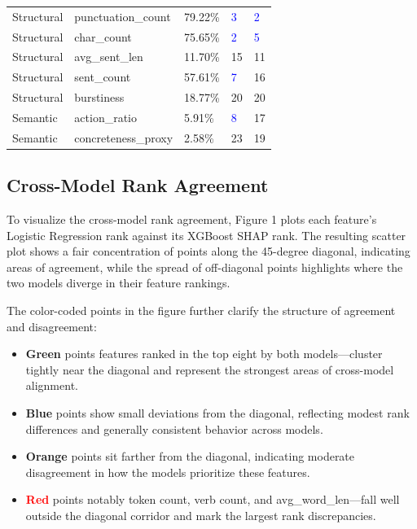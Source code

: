 \documentclass[12pt]{article}
\begin{document}
\begin{longtable}{lllll}
Structural & punctuation\_count & 79.22\% & \textcolor{blue}{3} & \textcolor{blue}{2} \\
Structural & char\_count & 75.65\% & \textcolor{blue}{2} & \textcolor{blue}{5} \\
Structural & avg\_sent\_len & 11.70\% & 15 & 11 \\
Structural & sent\_count & 57.61\% & \textcolor{blue}{7} & 16 \\
Structural & burstiness & 18.77\% & 20 & 20 \\
Semantic & action\_ratio & 5.91\% & \textcolor{blue}{8} & 17 \\
Semantic & concreteness\_proxy & 2.58\% & 23 & 19 \\
\end{longtable}

\subsection{Cross-Model Rank Agreement}

To visualize the cross-model rank agreement, Figure 1 plots each feature's Logistic Regression rank against its XGBoost SHAP rank. The resulting scatter plot shows a fair concentration of points along the 45-degree diagonal, indicating areas of agreement, while the spread of off-diagonal points highlights where the two models diverge in their feature rankings.

The color-coded points in the figure further clarify the structure of agreement and disagreement:

\begin{itemize}
\item \textcolor{greenpoint}{\textbf{Green}} points features ranked in the top eight by both models---cluster tightly near the diagonal and represent the strongest areas of cross-model alignment.
\item \textcolor{bluepoint}{\textbf{Blue}} points show small deviations from the diagonal, reflecting modest rank differences and generally consistent behavior across models.
\item \textcolor{amber}{\textbf{Orange}} points sit farther from the diagonal, indicating moderate disagreement in how the models prioritize these features.
\item \textcolor{red}{\textbf{Red}} points notably token count, verb count, and avg\_word\_len---fall well outside the diagonal corridor and mark the largest rank discrepancies.
\end{itemize}
\end{document}
